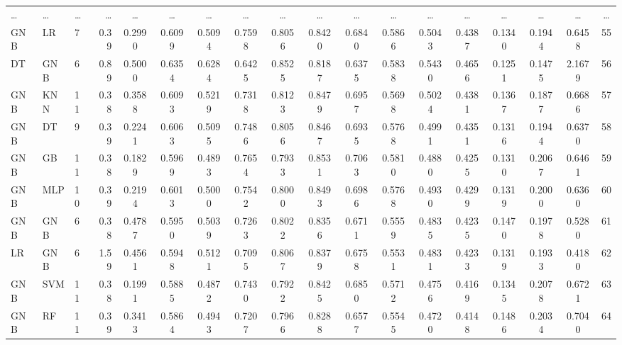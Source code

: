 \begin{table}[H]
{\begin{tabular}{|p{1.3cm}|p{1.2cm}|p{1.4cm}|r|c|c|c|c|c|c|c|c|c|c|c|c|c|c|}
        \ldots & \ldots & \ldots & \ldots & \ldots & \ldots & \ldots & \ldots & \ldots & \ldots & \ldots & \ldots & \ldots & \ldots & \ldots & \ldots & \ldots & \ldots \\
        GNB & LR & 7 & 0.39 & 0.2990 & 0.6099 & 0.5094 & 0.7598 & 0.8056 & 0.8420 & 0.6840 & 0.5866 & 0.5043 & 0.4387 & 0.1340 & 0.1944 & 0.6458
        & 55 \\
        DT & GNB & 6 & 0.89 & 0.5000 & 0.6354 & 0.6284 & 0.6425 & 0.8525 & 0.8187 & 0.6375 & 0.5838 & 0.5430 & 0.4656 & 0.1251 & 0.1475 & 2.1679 & 56 \\
        GNB & KNN & 11 & 0.38 & 0.3588 & 0.6093 & 0.5219 & 0.7318 & 0.8123 & 0.8479 & 0.6957 & 0.5698 & 0.5024 & 0.4381 & 0.1367 & 0.1877 & 0.6686 & 57 \\
        GNB & DT & 9 & 0.39 & 0.2241 & 0.6063 & 0.5095 & 0.7486 & 0.8056 & 0.8467 & 0.6935 & 0.5768 & 0.4991 & 0.4351 & 0.1316 & 0.1944 & 0.6370 & 58 \\
        GNB & GB & 11 & 0.38 & 0.1829 & 0.5969 & 0.4893 & 0.7654 & 0.7933 & 0.8531 & 0.7063 & 0.5810 & 0.4880 & 0.4255 & 0.1310 & 0.2067 & 0.6461 & 59 \\
        GNB & MLP & 10 & 0.39 & 0.2194 & 0.6013 & 0.5000 & 0.7542 & 0.8000 & 0.8493 & 0.6986 & 0.5768 & 0.4930 & 0.4299 & 0.1319 & 0.2000 & 0.6360 & 60 \\
        GNB & GNB & 6 & 0.38 & 0.4787 & 0.5950 & 0.5039 & 0.7263& 0.8022 & 0.8356 & 0.6711 & 0.5559 & 0.4835 & 0.4235 & 0.1470 & 0.1978 & 0.5280 & 61 \\
        LR & GNB & 6 & 1.59 & 0.4561 & 0.5948 & 0.5121 & 0.7095 & 0.8067 & 0.8379 & 0.6758 & 0.5531 & 0.4831 & 0.4233 & 0.1319 & 0.1933 & 0.4180 & 62 \\
        GNB & SVM & 11 & 0.38 & 0.1991 & 0.5885 & 0.4872 & 0.7430 & 0.7922 & 0.8425 & 0.6850 & 0.5712 & 0.4756 & 0.4169 & 0.1345 & 0.2078 & 0.6721 & 63 \\
        GNB & RF & 11 & 0.39 & 0.3413 & 0.5864 & 0.4943 & 0.7207 & 0.7966 & 0.8288 & 0.6577 & 0.5545 & 0.4720 & 0.4148 & 0.1486 & 0.2034 & 0.7040 & 64 \\
                \hline
                \bottomrule 
            \end{tabular}}
            \vspace{1em}
        
            \vspace{-1em}
        \end{table}
        
